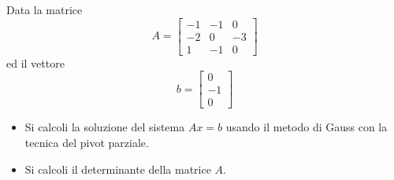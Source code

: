 Data la matrice
\bigskip
\[
A=\left[
\begin{array}{ccc}
-1 & -1 & 0 \\
-2 & 0 & -3\\
1 & -1 & 0
\end{array}\right]
\]
\noindent ed il vettore
\bigskip
\[
b=\left[
\begin{array}{ccc}
0\\
-1 \\
0
\end{array}\right]
\]
\begin{itemize}
\item Si calcoli la soluzione del sistema $Ax=b$ usando il metodo
di Gauss con la tecnica del pivot parziale.
\item Si calcoli il determinante della matrice $A$.
\end{itemize}
